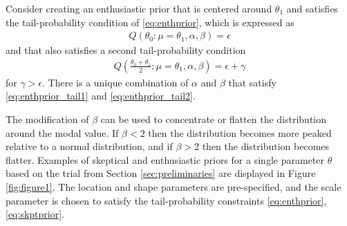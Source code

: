 \documentclass[12pt]{article}
\begin{document}
Consider creating an enthusiastic prior that is centered around $\theta_1$ and satisfies the tail-probability condition of \eqref{eq:enthprior}, which is expressed as 
\begin{align}\label{eq:enthprior_tail1}
Q(\theta_0:\mu=\theta_1,\alpha,\beta)=\epsilon
\end{align} and that also satisfies a second tail-probability condition 
\begin{align}
Q\left(\frac{\theta_0+\theta_1}{2};\mu=\theta_1,\alpha,\beta\right)=\epsilon+\gamma \label{eq:enthprior_tail2}
\end{align}
for $\gamma>\epsilon$. There is a unique combination of $\alpha$ and $\beta$ that satisfy \eqref{eq:enthprior_tail1} and \eqref{eq:enthprior_tail2}.


The modification of $\beta$ can be used to concentrate or flatten the distribution around the modal value. If $\beta<2$ then the distribution becomes more peaked relative to a normal distribution, and if $\beta>2$ then the distribution becomes flatter. Examples of skeptical and enthusiastic priors for a single parameter $\theta$ based on the trial from Section \ref{sec:preliminaries} are displayed in Figure \ref{fig:figure1}. The location and shape parameters are pre-specified, and the scale parameter is chosen to satisfy the tail-probability constraints \eqref{eq:enthprior}, \eqref{eq:skptprior}.

%
\end{document}
